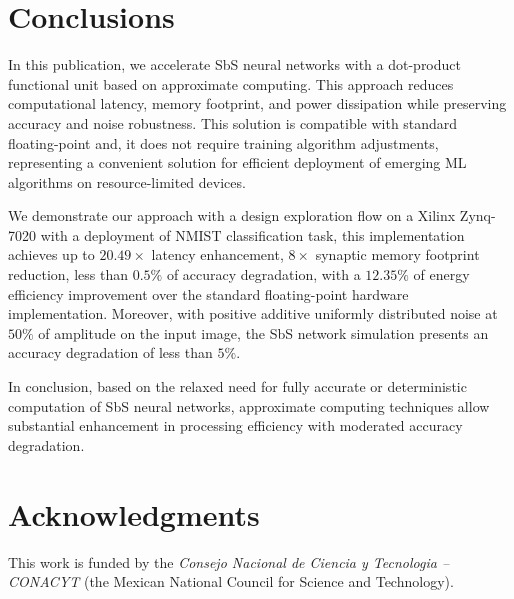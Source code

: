 \section{Conclusions}
\label{sec:conclusions}
In this publication, we accelerate SbS neural networks with a dot-product functional unit based on approximate computing. This approach reduces computational latency, memory footprint, and power dissipation while preserving accuracy and noise robustness. This solution is compatible with standard floating-point and, it does not require training algorithm adjustments, representing a convenient solution for efficient deployment of emerging ML algorithms on resource-limited devices.

We demonstrate our approach with a design exploration flow on a Xilinx Zynq-7020 with a deployment of NMIST classification task, this implementation achieves up to $20.49\times$ latency enhancement, $8\times$ synaptic memory footprint reduction, less than $0.5\%$ of accuracy degradation, with a $12.35\%$ of energy efficiency improvement over the standard floating-point hardware implementation. Moreover, with positive additive uniformly distributed noise at $50\%$ of amplitude on the input image, the SbS network simulation presents an accuracy degradation of less than $5\%$.

In conclusion, based on the relaxed need for fully accurate or deterministic computation of SbS neural networks, approximate computing techniques allow substantial enhancement in processing efficiency with moderated accuracy degradation.

\section * {Acknowledgments}\label{sec:Ack}
This work is funded by the \textit{Consejo Nacional de Ciencia y Tecnologia -- CONACYT} (the Mexican National Council for Science and Technology).
